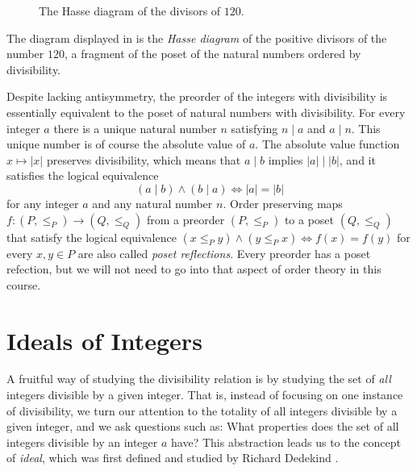 \begin{figure}[t]
  \caption{The Hasse diagram of the divisors of $120$.}
  \label{figure:hasse-diagram-120}
\end{figure}

The diagram displayed in  is the \emph{Hasse diagram} of the positive divisors of the number $120$, a fragment of the poset of the natural numbers ordered by divisibility.

Despite lacking antisymmetry, the preorder of the integers with divisibility is essentially equivalent to the poset of natural numbers with divisibility. For every integer $a$ there is a unique natural number $n$ satisfying $n\mid a$ and $a\mid n$. This unique number is of course the absolute value of $a$. The absolute value function $x\mapsto |x|$ preserves divisibility, which means that $a\mid b$ implies $|a| \mid |b|$, and it satisfies the logical equivalence
\begin{equation*}
  (a\mid b)\land (b\mid a) \Leftrightarrow |a|=|b|
\end{equation*}
for any integer $a$ and any natural number $n$. Order preserving maps $f : (P,\leq_P) \to (Q,\leq_Q)$ from a preorder $(P,\leq_P)$ to a poset $(Q,\leq_Q)$ that satisfy the logical equivalence $(x\leq_P y)\land (y\leq_P x) \Leftrightarrow f(x)=f(y)$ for every $x,y\in P$ are also called \emph{poset reflections}. Every preorder has a poset refection, but we will not need to go into that aspect of order theory in this course.

\section{Ideals of Integers}

A fruitful way of studying the divisibility relation is by studying the set of \emph{all} integers divisible by a given integer. That is, instead of focusing on one instance of divisibility, we turn our attention to the totality of all integers divisible by a given integer, and we ask questions such as: What properties does the set of all integers divisible by an integer $a$ have? This abstraction leads us to the concept of \emph{ideal}, which was first defined and studied by Richard Dedekind \cite{dedekind1871,kleiner1998}.

